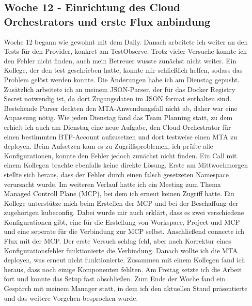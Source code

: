 \subsection{Woche 12 - Einrichtung des Cloud Orchestrators und erste Flux anbindung}
Woche 12 begann wie gewohnt mit dem Daily. Danach arbeitete ich weiter an den Tests für den Provider, konkret am TestObserve.
Trotz vieler Versuche konnte ich den Fehler nicht finden, auch mein Betreuer wusste zunächst nicht weiter.
Ein Kollege, der den test geschrieben hatte, konnte mir schließlich helfen, sodass das Problem gelöst werden konnte.
Die Änderungen habe ich am Dienstag gepusht.
Zusätzlich arbeitete ich an meinem JSON-Parser, der für das Docker Registry Secret notwendig ist, da dort Zugangsdaten im
JSON format enthalten sind.
Bestehende Parser deckten den MTA-Anwendungsfall nicht ab, daher war eine Anpassung nötig.
Wie jeden Dienstag fand das Team Planning statt, zu dem erhielt ich auch am Dienstag eine neue Aufgabe, den Cloud Orchestrator
für einen bestimmten BTP-Account aufzusetzen und dort testweise einen MTA zu deployen.
Beim Aufsetzen kam es zu Zugriffsproblemen, ich prüfte alle Konfigurationen, konnte den Fehler jedoch zunächst nicht finden.
Ein Call mit einem Kollegen brachte ebenfalls keine direkte Lösung.
Erste am Mittwochmorgen stellte sich heraus, dass der Fehler durch einen falsch gesetzeten Namespace verursacht wurde.
Im weiteren Verlauf hatte ich ein Meeting zum Thema Managed Controll Plane (MCP), bei dem ich erneut keinen Zugriff hatte.
Ein Kollege unterstütze mich beim Erstellen der MCP und bei der Beschaffung der zugehörigen kubeconfig.
Dabei wurde mir auch erklärt, dass es zwei verschiedene Konfigurationen gibt, eine für die Erstellung von Workspace, Project
und MCP und eine seperate für die Verbindung zur MCP selbst.
Anschließend connecte ich Flux mit der MCP.
Der erste Versuch schlug fehl, aber nach Korrektur eines Konfigurationsfehler funktionierte die Verbindung.
Danach wollte ich die MTA deployen, was erneut nicht funktionierte.
Zusammen mit einem Kollegen fand ich heraus, dass noch einige Komponenten fehlten.
Am Freitag setzte ich die Arbeit fort und konnte das Setup fast abschließen.
Zum Ende der Woche fand ein Gespärch mit meinem Manager statt, in dem ich den aktuellen Stand präsentierte und das weitere
Vorgehen besprochen wurde.

